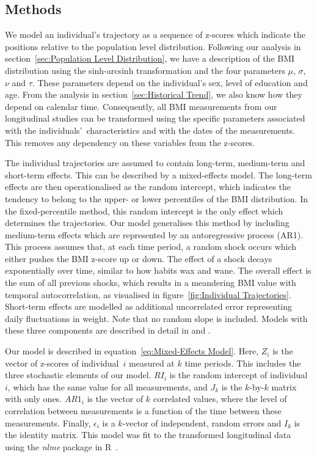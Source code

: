 \documentclass{imammb}
\numberwithin{equation}{section}
\begin{document}
\subsection{Methods}
\label{sec:Individual Trajectories/Methods}

We model an individual's trajectory as a sequence of z-scores which indicate the positions relative to the population level distribution. Following our analysis in section~\ref{sec:Population Level Distribution}, we have a description of the BMI distribution using the sinh-arcsinh transformation and the four parameters $\mu$, $\sigma$, $\nu$ and $\tau$. These \mbox{parameters} depend on the individual's sex, level of education and age. From the analysis in section~\ref{sec:Historical Trend}, we also know how they depend on calendar time. Consequently, all BMI measurements from our longitudinal studies can be transformed using the specific parameters associated with the individuals'~characteristics and with the dates of the measurements. This removes any dependency on these variables from the z-scores.

The individual trajectories are assumed to contain long-term, medium-term and short-term effects. This can be described by a mixed-effects model. The long-term effects are then operationalised as the random intercept, which indicates the tendency to belong to the upper- or lower percentiles of the BMI distribution. In the fixed-percentile method, this random intercept is the only effect which determines the trajectories. Our model generalises this method by including medium-term effects which are represented by an autoregressive process (AR1). This process assumes that, at each time period, a random shock occurs which either pushes the BMI z-score up or down. The effect of a shock decays exponentially over time, similar to how habits wax and wane. The overall effect is the sum of all previous shocks, which results in a meandering BMI value with temporal autocorrelation, as visualised in figure~\ref{fig:Individual Trajectories}. Short-term effects are modelled as additional uncorrelated error representing daily fluctuations in weight. Note that no random slope is included. Models with these three components are described in detail in \cite{Diggle1988, Diggle1994} and \cite{Verbeke2000}.

Our model is described in equation~\ref{eq:Mixed-Effects Model}. Here, $Z_{i}$ is the vector of z-scores of individual~$i$ measured at $k$ time periods. This includes the three stochastic elements of our model. $RI_i$ is the random intercept of individual~$i$, which has the same value for all measurements, and $J_k$ is the $k$-by-$k$ matrix with only ones. $AR1_i$ is the vector of $k$ correlated values, where the level of correlation between measurements is a function of the time between these measurements. Finally, $\epsilon_{i}$ is a $k$-vector of independent, random errors and $I_k$ is the identity matrix. This model was fit to the transformed longitudinal data using the \textit{nlme} package in R~\citep{nlme2021, R2021}.
\end{document}
